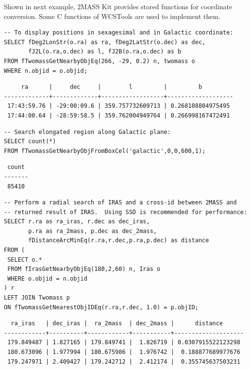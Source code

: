 Shown in next example, 2MASS Kit provides stored functions for coordinate conversion. Some C functions of WCSTools \citep{min_2006} are used to implement them. 

{\small
\begin{verbatim}
-- To display positions in sexagesimal and in Galactic coordinate:
SELECT fDeg2LonStr(o.ra) as ra, fDeg2LatStr(o.dec) as dec, 
       fJ2L(o.ra,o.dec) as l, fJ2B(o.ra,o.dec) as b
FROM fTwomassGetNearbyObjEq(266, -29, 0.2) n, twomass o
WHERE n.objid = o.objid;
\end{verbatim}
}

{\small
\begin{verbatim}
     ra      |     dec     |        l         |         b         
-------------+-------------+------------------+-------------------
 17:43:59.76 | -29:00:09.6 | 359.757732609713 | 0.268108804975495
 17:44:00.64 | -28:59:58.5 | 359.762004949764 | 0.266998167472491
\end{verbatim}
}

{\small
\begin{verbatim}
-- Search elongated region along Galactic plane:
SELECT count(*) 
FROM fTwomassGetNearbyObjFromBoxCel('galactic',0,0,600,1);
\end{verbatim}
}

{\small
\begin{verbatim}
 count 
-------
 85410
\end{verbatim}
}

{\small
\begin{verbatim}
-- Perform a radial search of IRAS and a cross-id between 2MASS and
-- returned result of IRAS.  Using SSD is recommended for performance:
SELECT r.ra as ra_iras, r.dec as dec_iras,
       p.ra as ra_2mass, p.dec as dec_2mass,
       fDistanceArcMinEq(r.ra,r.dec,p.ra,p.dec) as distance
FROM (
 SELECT o.*
 FROM fIrasGetNearbyObjEq(180,2,60) n, Iras o
 WHERE o.objid = n.objid
) r
LEFT JOIN Twomass p
ON fTwomassGetNearestObjIDEq(r.ra,r.dec, 1.0) = p.objID;
\end{verbatim}
}

{\small
\begin{verbatim}
  ra_iras   | dec_iras |  ra_2mass  | dec_2mass |      distance      
------------+----------+------------+-----------+--------------------
 179.849487 | 1.827165 | 179.849741 |  1.826719 | 0.0307915522123298
 180.673096 | 1.977994 | 180.675986 |  1.976742 |  0.188877689977676
 179.247971 | 2.409427 | 179.242712 |  2.412174 |  0.355745637503231
\end{verbatim}
}


